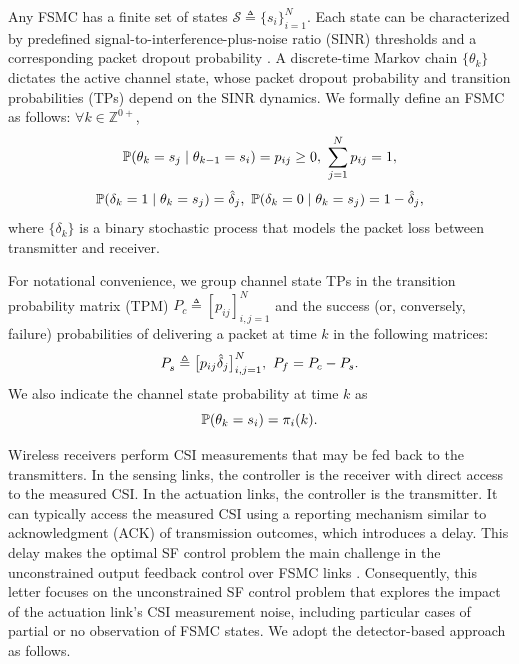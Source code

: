 \documentclass[letterpaper, 10 pt, conference]{ieeeconf}  %
\begin{document}
Any FSMC has a finite set of states $\mathcal{S}\triangleq\{s_i\}_{i=1}^{N}$. Each state can be characterized by predefined signal-to-interference-plus-noise ratio (SINR) thresholds and a corresponding packet dropout probability \cite{zacchialun2024access}. A discrete-time Markov chain $\{\theta_k\}$ dictates the active channel state, whose packet dropout probability and transition probabilities (TPs) depend on the SINR dynamics. We formally define an FSMC as follows: $\forall k\in \mathbb{Z}^{0+}$,
\begin{equation}\label{eq:p-ij}
    \text{\small $\mathbb{P}(\theta_{k} = s_j \mid \theta_{k-1} = s_i) = p_{ij} \geq 0,~ \sum_{j=1}^N p_{ij} = 1$},
\end{equation}
\begin{equation}\label{eq:p-delta}
    \text{\small $\mathbb{P}(\delta_k = 1 \mid \theta_{k} = s_j) = \hat{\delta}_{j},~
    \mathbb{P}(\delta_k = 0 \mid \theta_{k} = s_j) = 1 - \hat{\delta}_{j}$},
\end{equation}
where $\{\delta_k\}$ is a binary stochastic process that models the packet loss between transmitter and receiver.

For notational convenience, we group
channel state TPs in the transition probability matrix (TPM) $P_{c}^{} \triangleq \left[p_{ij}\right]_{i,j=1}^{N}$
and the  success (or, conversely, failure) probabilities of delivering a packet at time $k$ in the following matrices:
\begin{equation}\label{eq:Ps}
    \text{\small $P_{s}^{} \triangleq \big[p_{ij}\hat{\delta}_{j}\big]_{i,j=1}^{N},~P_{f} = P_{c} - P_{s}$}.
\end{equation}
We also indicate the channel state probability at time $k$ as
\begin{equation}\label{eq:pik}
     \text{\small $\mathbb{P}(\theta_{k} = s_i) = \pi_{i}(k)$}.
\end{equation}

Wireless receivers perform CSI measurements that may be fed back to the transmitters. In the sensing links, the controller is the receiver with direct access to the measured CSI. In the actuation links, the controller is the transmitter. It can typically access the measured CSI using a reporting mechanism similar to acknowledgment (ACK) of transmission outcomes, which introduces a delay. This delay makes the optimal SF control problem the main challenge in the unconstrained output feedback control over FSMC links \cite{impicciatore2024tac}. Consequently, this letter focuses on the unconstrained SF control problem that explores the impact of the actuation link's CSI measurement noise, including particular cases of partial or no observation of FSMC states. We adopt the detector-based approach as follows.
\end{document}
